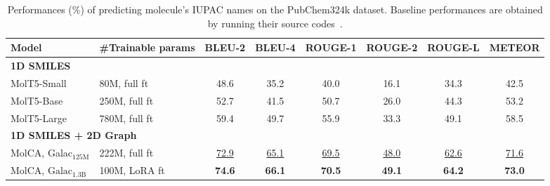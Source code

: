 \documentclass[11pt]{article}
\begin{document}
\begin{table*}[t]
\small
\centering
\begin{tabular}{llcccccc} \toprule
Model & \#Trainable params       & BLEU-2               & BLEU-4               & ROUGE-1              & ROUGE-2              & ROUGE-L              & METEOR               \\ \midrule
\multicolumn{2}{l}{\textbf{1D SMILES}}            & \multicolumn{1}{l}{} & \multicolumn{1}{l}{} & \multicolumn{1}{l}{} & \multicolumn{1}{l}{} & \multicolumn{1}{l}{} & \multicolumn{1}{l}{} \\
MolT5-Small            & 80M, full ft                      & 48.6                 & 35.2                 & 40.0                 & 16.1                 & 34.3                 & 42.5                 \\
MolT5-Base             & 250M, full ft                     & 52.7                 & 41.5                 & 50.7                 & 26.0                 & 44.3                 & 53.2                 \\
MolT5-Large            & 780M, full ft                     & 59.4                 & 49.7                 & 55.9                 & 33.3                 & 49.1                 & 58.5                 \\\midrule
\multicolumn{2}{l}{\textbf{1D SMILES + 2D Graph}} & \multicolumn{1}{l}{} & \multicolumn{1}{l}{} & \multicolumn{1}{l}{} & \multicolumn{1}{l}{} & \multicolumn{1}{l}{} & \multicolumn{1}{l}{} \\
MolCA, Galac$_{\text{125M}}$  & 222M, full ft              & \underline{72.9}                 & \underline{65.1}                 & \underline{69.5}                 & \underline{48.0}                 & \underline{62.6}                 & \underline{71.6}                 \\
MolCA, $\text{Galac}_{\text{1.3B}}$        & 100M, LoRA ft                     & \textbf{74.6}        & \textbf{66.1}        & \textbf{70.5}        & \textbf{49.1}        & \textbf{64.2}        & \textbf{73.0}  \\ \bottomrule
\end{tabular}
\caption{Performances (\%) of predicting molecule's IUPAC names on the PubChem324k dataset. Baseline performances are obtained by running their source codes~\citep{MolT5}.}
 \vspace{-4mm}
\label{tab:iupac}
\end{table*}
\end{document}
